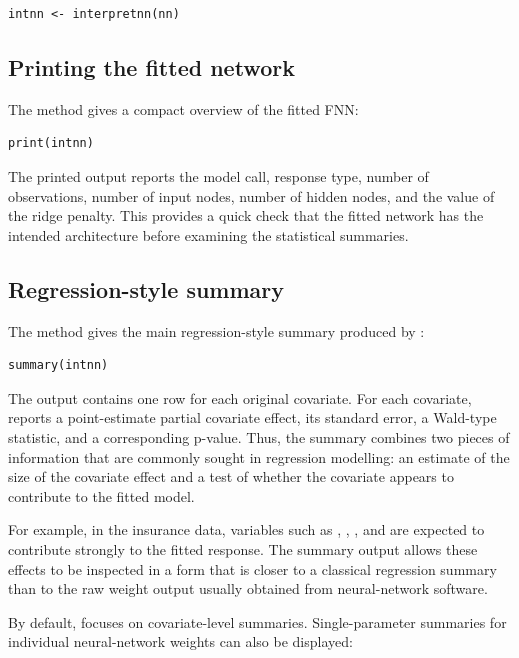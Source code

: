 \begin{verbatim}
intnn <- interpretnn(nn)
\end{verbatim}

\subsection{Printing the fitted network}\label{printing-the-fitted-network}

The  method gives a compact overview of the fitted FNN:

\begin{verbatim}
print(intnn)
\end{verbatim}

The printed output reports the model call, response type, number of observations, number of input nodes, number of hidden nodes, and the value of the ridge penalty.
This provides a quick check that the fitted network has the intended architecture before examining the statistical summaries.

\subsection{Regression-style summary}\label{regression-style-summary}

The  method gives the main regression-style summary produced by :

\begin{verbatim}
summary(intnn)
\end{verbatim}

The output contains one row for each original covariate.
For each covariate,  reports a point-estimate partial covariate effect, its standard error, a Wald-type statistic, and a corresponding p-value.
Thus, the summary combines two pieces of information that are commonly sought in regression modelling: an estimate of the size of the covariate effect and a test of whether the covariate appears to contribute to the fitted model.

For example, in the insurance data, variables such as , , , and  are expected to contribute strongly to the fitted response.
The summary output allows these effects to be inspected in a form that is closer to a classical regression summary than to the raw weight output usually obtained from neural-network software.

By default,  focuses on covariate-level summaries.
Single-parameter summaries for individual neural-network weights can also be displayed:

